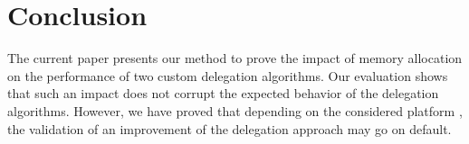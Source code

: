 \documentclass[10pt]{article}											%
\begin{document}



\section{Conclusion}

The current paper presents our method to prove the impact of memory allocation on the performance of two custom delegation algorithms.   Our evaluation shows that such an impact does not corrupt the expected behavior of the delegation algorithms.   However, we have proved that depending on the considered platform , the validation of an improvement of the delegation approach may go on default.




\nocite{*}
\small{
\vspace{0.75in}}
\end{document}
